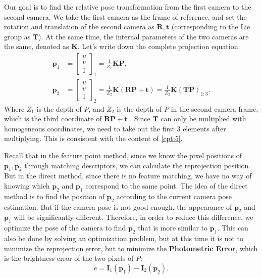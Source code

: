 Our goal is to find the relative pose transformation from the first camera to the second camera. We take the first camera as the frame of reference, and set the rotation and translation of the second camera as $\mathbf{R}, \mathbf{t}$ (corresponding to the Lie group as $\mathbf{T}$). At the same time, the internal parameters of the two cameras are the same, denoted as $\mathbf{K}$. Let's write down the complete projection equation:
\begin{align*}
{\mathbf{p}_1} &= {\left[ \begin{array}{l}
	u\\
	v\\
	1
	\end{array} \right]_1} = \frac{1}{Z_1} \mathbf{KP}, \\
{\mathbf{p}_2} &= {\left[ \begin{array}{l}
	u\\
	v\\
	1
	\end{array} \right]_2} = \frac{1}{Z_2} \mathbf{K}\left( {\mathbf{RP} +\mathbf{t}} \right) = \frac{1}{Z_2} \mathbf{K} \left(\mathbf{T}  \mathbf{P} \right)_{1:3}.
\end{align*}
Where $Z_1$ is the depth of $P$, and $Z_2$ is the depth of $P$ in the second camera frame, which is the third coordinate of $\mathbf{RP}+\mathbf{t}$ . Since $\mathbf{T}$ can only be multiplied with homogeneous coordinates, we need to take out the first 3 elements after multiplying. This is consistent with the content of \ref{cpt:5}.

Recall that in the feature point method, since we know the pixel positions of $\mathbf{p}_1, \mathbf{p}_2$ through matching descriptors, we can calculate the reprojection position. But in the direct method, since there is no feature matching, we have no way of knowing which $\mathbf{p}_2$ and $\mathbf{p}_1$ correspond to the same point. The idea of the direct method is to find the position of $\mathbf{p}_2$ according to the current camera pose estimation. But if the camera pose is not good enough, the appearance of $\mathbf{p}_2$ and $\mathbf{p}_1$ will be significantly different. Therefore, in order to reduce this difference, we optimize the pose of the camera to find $\mathbf{p}_2$ that is more similar to $\mathbf{p}_1$. This can also be done by solving an optimization problem, but at this time it is not to minimize the reprojection error, but to minimize the \textbf{Photometric Error}, which is the brightness error of the two pixels of $P$:
\begin{equation}
e = {\mathbf{I}_1}\left( {{\mathbf{p}_1}} \right) - {\mathbf{I}_2}\left( {{\mathbf{p}_2}} \right).
\end{equation}

